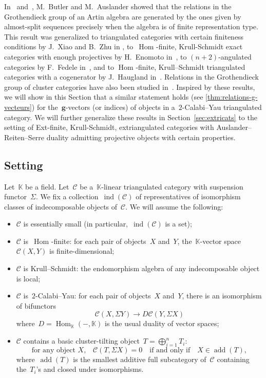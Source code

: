 \documentclass{amsart}
\theoremstyle{definition}
\renewcommand{\b}[1]{{\boldsymbol{#1}}} %
\newcommand{\field}{\mathbb{K}}
\newcommand{\cat}{\mathcal{C}}
\newcommand{\Hom}[1]{\operatorname{Hom}_{#1}}
\newcommand{\susp}{\Sigma}
\newcommand{\add}{\operatorname{add}}
\newcommand{\ind}{\operatorname{ind}}
\begin{document}
In~\cite{Butler} and~\cite{Auslander1984}, M.~Butler and M.~Auslander showed that the relations in the Grothendieck group of an Artin algebra are generated by the ones given by almost-split sequences precisely when the algebra is of finite representation type.  This result was generalized to triangulated categories with certain finiteness conditions by J.~Xiao and B.~Zhu in \cite{XiaoZhu}, to~$\Hom{}$-finite, Krull-Schmidt exact categories with enough projectives by H.~Enomoto in~\cite{Enomoto}, to $(n+2)$-angulated categories by F.~Fedele in~\cite{Fedele}, and to $\Hom{}$-finite, Krull--Schmidt triangulated categories with a cogenerator by J.~Haugland in~\cite{Haugland}. Relations in the Grothendieck group of cluster categories have also been studied in~\cite{Palu-grothendieckGroup}.  Inspired by these results, we will show in this Section that a similar statement holds (see \cref{thm:relations-g-vecteurs}) for the~$\b{g}$-vectors (or indices) of objects in a~$2$-Calabi--Yau triangulated category.  We will further generalize these results in Section~\ref{sec:extricats} to the setting of Ext-finite, Krull-Schmidt, extriangulated categories with Auslander--Reiten--Serre duality admitting projective objects with certain properties.


\subsection{Setting}
\label{sec:setting}

Let~$\field$ be a field. Let~$\cat$ be a~$\field$-linear triangulated category with suspension functor~$\susp$. We fix a collection~$\ind(\cat)$ of representatives of isomorphism classes of indecomposable objects of~$\cat$. We will assume the following:
\begin{itemize}
\item $\cat$ is essentially small (in particular,~$\ind(\cat)$ is a set);
\item $\cat$ is~$\Hom{}$-finite: for each pair of objects~$X$ and~$Y$, the~$\field$-vector space~$\cat(X,Y)$ is finite-dimensional;
\item $\cat$ is Krull--Schmidt: the endomorphism algebra of any indecomposable object is local;
\item $\cat$ is~$2$-Calabi--Yau: for each pair of objects~$X$ and~$Y$, there is an isomorphism of bifunctors
\[
\cat(X,\susp Y) \to D\cat(Y,\susp X)
\]
where~$D = \Hom{\field}(-,\field)$ is the usual duality of vector spaces;
\item $\cat$ contains a basic cluster-tilting object~$T = \bigoplus_{i=1}^n T_i$:
\[
\textrm{for any object~$X$,} \quad \cat(T, \susp X) = 0 \quad \textrm{if and only if} \quad X \in \add(T),
\]
where~$\add(T)$ is the smallest additive full subcategory of~$\cat$ containing the~$T_i$'s and closed under isomorphisms.
\end{itemize}
\end{document}
